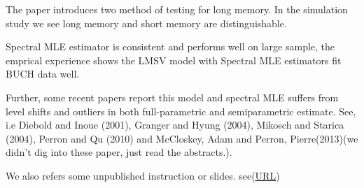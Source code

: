 \documentclass[10pt,a4paper]{article}
\begin{document}
The paper introduces two method of testing for long memory. In the simulation study we see long memory and short memory are distinguishable. 

Spectral MLE estimator is consistent and performs well on large sample, the emprical experience shows the LMSV model with Spectral MLE estimators fit BUCH data well.

Further, some recent papers report this model and spectral MLE suffers from level shifts and outliers in both full-parametric and semiparametric estimate. See, i.e Diebold and Inoue (2001)\cite{diebold2001long}, Granger and Hyung (2004)\cite{granger2004occasional},
Mikosch and Starica (2004)\cite{mikosch2004nonstationarities}, Perron and Qu (2010)\cite{shumway2000time} and McCloskey, Adam and Perron, Pierre(2013)\cite{mccloskey2013memory}(we didn't dig into these paper, just read the abstracts.).

\renewcommand\refname{Reference}

 
We also refers some unpublished instruction or slides. see(\url{URL})
\end{document}
